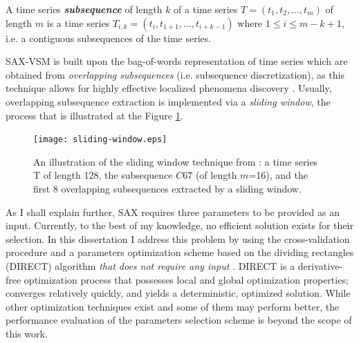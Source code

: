 \begin{defn}\label{def_subsequence}
A time series \textbf{\textit{subsequence}} of length $k$ of a time series $T = (t_{1}, t_{2},...,t_{m})$ of length $m$ is a time 
series $T_{i,k} = (t_{i},t_{1+1},...,t_{i+k-1})$  where $1 \leq i \leq m - k + 1$, i.e. a contiguous subsequences of the time series.
\end{defn}

SAX-VSM is built upon the bag-of-words representation of time series which are obtained from \textit{overlapping subsequences}
(i.e. subsequence discretization), as this technique allows for highly effective localized phenomena discovery 
\cite{citeulike:3977965} \cite{citeulike:3175749} \cite{citeulike:2821475}.
Usually, overlapping subsequence extraction is implemented via a \textit{sliding window}, the process that is illustrated at the 
Figure \ref{fig:sliding_window}.


\begin{figure}[t]
   \centering
   \texttt{[image: sliding-window.eps]}
   \caption{An illustration of the sliding window technique from \cite{citeulike:2821475}: a time series T of length 128, 
   the subsequence $C67$ (of length $m$=16), and the first 8 overlapping subsequences extracted by a sliding window.}
   \label{fig:sliding_window}
\end{figure}

As I shall explain further, SAX requires three parameters to be provided as an input. Currently, to the best of my knowledge, 
no efficient solution exists for their selection. 
In this dissertation I address this problem by using the cross-validation procedure and a parameters optimization scheme 
based on the dividing rectangles (DIRECT) algorithm \textit{that does not require any input} \cite{citeulike:12563460}. 
DIRECT is a derivative-free optimization process that possesses local and global optimization properties; converges relatively quickly, 
and yields a deterministic, optimized solution. While other optimization techniques exist and some of them may perform better, 
the performance evaluation of the parameters selection scheme is beyond the scope of this work.

